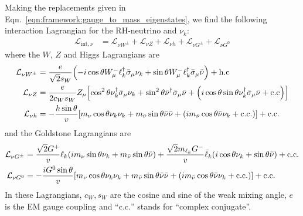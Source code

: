 \documentclass[a4paper,11pt]{article} \pdfoutput=1
\newcommand{\rhn}{\bar{\nu}}
\newcommand{\cL}{\mathcal{L}}
\newcommand{\cw}{{c_{W}}}
\newcommand{\sw}{{s_{W}}}
\begin{document}
Making the replacements given in Eqn.~\ref{eqn:framework:gauge_to_mass_eigenstates}, we find
the following interaction Lagrangian for the RH-neutrino and \(\nu_{k}\):
\begin{align}\label{eqn:framework:ew_interaction_lagrangian}
	\cL_{\mathrm{int},\nu} & =
	\cL_{\nu W^{\pm}}
	+ \cL_{\nu Z}
	+ \cL_{\nu h}
	+ \cL_{\nu G^{\pm}}
	+ \cL_{\nu G^{0}}
\end{align}
where the \(W\), \(Z\) and Higgs Lagrangians are
\begin{align}
	\cL_{\nu W^{\pm}}
	 & =
	\frac{e}{\sqrt{2}\sw}\qty(-i\cos\theta W^{-}_{\mu}\ell^{\dagger}_{k}\bar{\sigma}_{\mu}\nu_{k}
	+ \sin\theta W^{-}_{\mu}\ell^{\dagger}_{k}\bar{\sigma}_{\mu}\rhn) + \mathrm{h.c} \\
	\cL_{\nu Z}
	 & =
	\frac{e}{2\cw\sw}Z_{\mu}\qty[
		\cos^2\theta\nu^{\dagger}_{k}\bar{\sigma}_{\mu}\nu_{k}
		+ \sin^2\theta\rhn^{\dagger}\bar{\sigma}_{\mu}\rhn
		+ \qty(i\cos\theta\sin\theta \nu_{k}^{\dagger}\bar{\sigma}_{\mu}\rhn + \mathrm{c.c})
	]                                                                                \\
	\cL_{\nu h}
	 & =
	-\frac{h\sin\theta}{v}\qty[
		m_{\nu}\cos\theta\nu_{k}\nu_{k}
		+ m_{\rhn}\sin\theta\rhn\rhn
		+ \qty(i m_{\rhn}\cos\theta\rhn\nu_{k} + \mathrm{c.c.})
	] + \mathrm{c.c.}
\end{align}
and the Goldstone Lagrangians are
\begin{align}
	\cL_{\nu G^{\pm}}
	 & =
	\frac{\sqrt{2}G^{+}}{v}\ell_{k}\qty(
	im_{\nu}\sin\theta\nu_{k}
	+ m_{\rhn}\sin\theta\rhn)
	+ \frac{\sqrt{2}m_{\ell_{k}}G^{-}}{v}\bar{\ell}_{k}\qty(
	i\cos\theta\nu_{k}
	+ \sin\theta\rhn)
	+ \mathrm{c.c.}
	\\
	\cL_{\nu G^{0}}
	 & =
	-\frac{i G^{0}\sin\theta}{v}\qty[
		m_{\nu}\cos\theta\nu_{k}\nu_{k}
		+ m_{\rhn}\sin\theta\rhn\rhn
		+ \qty(i m_{\rhn}\cos\theta\rhn\nu_{k} + \mathrm{c.c.})
	] + \mathrm{c.c.}
\end{align}
In these Lagrangians, \(c_{W},s_{W}\) are the cosine and sine of the weak
mixing angle, \(e\) is the EM gauge coupling and ``\(\mathrm{c.c.}\)'' stands
for ``complex conjugate''.
\end{document}
